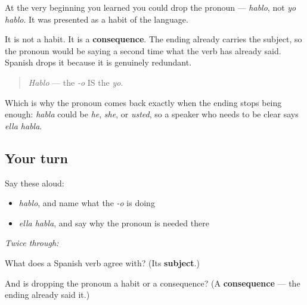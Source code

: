 \begin{culture}
At the very beginning you learned you could drop the pronoun — \emph{hablo}, not \emph{yo hablo}. It was presented as a habit of the language.

It is not a habit. It is a \textbf{consequence}. The ending already carries the subject, so the pronoun would be saying a second time what the verb has already said. Spanish drops it because it is genuinely redundant.

\begin{quote}
\emph{Hablo} — the \emph{-o} IS the \emph{yo}.
\end{quote}

Which is why the pronoun comes back exactly when the ending stops being enough: \emph{habla} could be \emph{he}, \emph{she}, or \emph{usted}, so a speaker who needs to be clear says \emph{ella habla}.
\end{culture}

\subsection*{Your turn}
Say these aloud:

\begin{itemize}
\raggedright
  \item \emph{hablo}, and name what the \emph{-o} is doing
  \item \emph{ella habla}, and say why the pronoun is needed there
\end{itemize}

\emph{Twice through:}

\begin{tcolorbox}[breakable,colback=teal!4,colframe=teal!35!black,title={Before you move on}]
What does a Spanish verb agree with? (Its \textbf{subject}.)

And is dropping the pronoun a habit or a consequence? (A \textbf{consequence} — the ending already said it.)
\end{tcolorbox}
